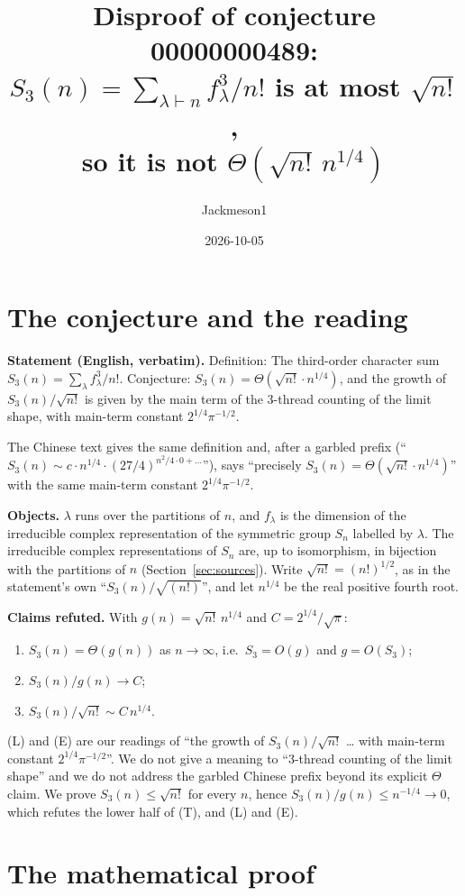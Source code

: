 \documentclass[11pt]{article}
\title{Disproof of conjecture 00000000489:\\ $S_3(n)=\sum_{\lambda\vdash n} f_\lambda^3/n!$ is at most $\sqrt{n!}$,\\ so it is not $\Theta(\sqrt{n!}\,n^{1/4})$}
\author{Jackmeson1}
\date{2026-10-05}
\theoremstyle{definition}
\begin{document}
\maketitle

\section{The conjecture and the reading}

\textbf{Statement (English, verbatim).} Definition: The third-order character sum
$S_3(n)=\sum_\lambda f_\lambda^3/n!$. Conjecture: $S_3(n)=\Theta(\sqrt{n!}\cdot n^{1/4})$, and the
growth of $S_3(n)/\sqrt{n!}$ is given by the main term of the 3-thread counting of the limit shape,
with main-term constant $2^{1/4}\pi^{-1/2}$.

The Chinese text gives the same definition and, after a garbled prefix
(``$S_3(n)\sim c\cdot n^{1/4}\cdot(27/4)^{n^2/4\cdot 0+\dots}$''), says ``precisely
$S_3(n)=\Theta(\sqrt{n!}\cdot n^{1/4})$'' with the same main-term constant $2^{1/4}\pi^{-1/2}$.

\textbf{Objects.} $\lambda$ runs over the partitions of $n$, and $f_\lambda$ is the dimension of
the irreducible complex representation of the symmetric group $S_n$ labelled by $\lambda$. The
irreducible complex representations of $S_n$ are, up to isomorphism, in bijection with the
partitions of $n$ (Section~\ref{sec:sources}). Write $\sqrt{n!}=(n!)^{1/2}$, as in the
statement's own ``$S_3(n)/\sqrt{(n!)}$'', and let $n^{1/4}$ be the real positive fourth root.

\textbf{Claims refuted.} With $g(n)=\sqrt{n!}\,n^{1/4}$ and $C=2^{1/4}/\sqrt{\pi}$:
\begin{enumerate}
\item[(T)] $S_3(n)=\Theta(g(n))$ as $n\to\infty$, i.e.\ $S_3=O(g)$ and $g=O(S_3)$;
\item[(L)] $S_3(n)/g(n)\to C$;
\item[(E)] $S_3(n)/\sqrt{n!}\sim C\,n^{1/4}$.
\end{enumerate}
(L) and (E) are our readings of ``the growth of $S_3(n)/\sqrt{n!}$ \dots{} with main-term
constant $2^{1/4}\pi^{-1/2}$''. We do not give a meaning to ``3-thread counting of the limit
shape'' and we do not address the garbled Chinese prefix beyond its explicit $\Theta$ claim.
We prove $S_3(n)\le\sqrt{n!}$ for every $n$, hence $S_3(n)/g(n)\le n^{-1/4}\to 0$, which refutes
the lower half of (T), and (L) and (E).

\section{The mathematical proof}
\end{document}
